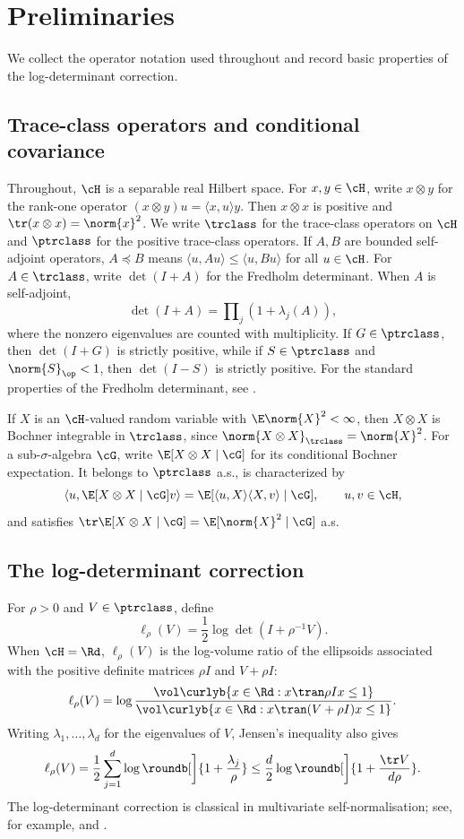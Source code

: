 \documentclass[11pt]{article}
\begin{document}
\section{Preliminaries}
\label{sec:prelims}

We collect the operator notation used throughout and record basic properties of the log-determinant correction.

\subsection{Trace-class operators and conditional covariance}
Throughout, $\cH$ is a separable real Hilbert space. For $x,y\in\cH$, write
$x\otimes y$ for the rank-one operator $(x\otimes y)u=\langle x,u\rangle y$.
Then $x\otimes x$ is positive and $\tr(x\otimes x)=\norm{x}^2$. We write
$\trclass$ for the trace-class operators on $\cH$ and $\ptrclass$
for the positive trace-class operators. If $A,B$ are bounded self-adjoint operators,
$A\preceq B$ means $\langle u,Au\rangle\le\langle u,Bu\rangle$ for all $u\in\cH$. For $A\in\trclass$, write $\det(I+A)$ for the Fredholm determinant. When $A$ is self-adjoint,
\[
  \det(I+A)=\prod\nolimits_j(1+\lambda_j(A)),
\]
where the nonzero eigenvalues are counted with multiplicity. If $G\in\ptrclass$, then $\det(I+G)$ is strictly positive, while if $S\in\ptrclass$ and $\norm{S}_{\op}<1$, then $\det(I-S)$ is strictly positive. For the standard properties of the Fredholm determinant, see \citet[Ch.~3]{simon2005trace}.

If $X$ is an $\cH$-valued random variable with $\E\norm{X}^2<\infty$, then $X\otimes X$ is Bochner integrable in $\trclass$, since $\norm{X\otimes X}_{\trclass}=\norm{X}^2$. For a sub-$\sigma$-algebra $\cG$, write $\E[X\otimes X\mid\cG]$ for its conditional Bochner expectation. It belongs to $\ptrclass$ a.s., is characterized by
\[
  \langle u,\E[X\otimes X\mid\cG]v\rangle=\E[\langle u,X\rangle\langle X,v\rangle\mid\cG], \qquad u,v\in\cH,
\]
and satisfies $\tr\E[X\otimes X\mid\cG]=\E[\norm{X}^2\mid\cG]$ a.s.

\subsection{The log-determinant correction} For $\rho>0$ and $V\in\ptrclass$, define
\[
  \ell_\rho(V)=\frac12\log\det(I+\rho^{-1}V).
\]
When $\cH=\Rd$, $\ell_\rho(V)$ is the log-volume ratio of the ellipsoids associated with the positive definite matrices $\rho I$ and $V+\rho I$:
\[
  \ell_\rho(V) = \log \frac{\vol\curlyb{x\in\Rd:x\tran \rho I x\le1}}{\vol\curlyb{x\in\Rd:x\tran (V+\rho I)x\le1}}.
\]
Writing $\lambda_1,\dots,\lambda_d$ for the eigenvalues of $V$, Jensen's inequality also gives
\[
  \ell_\rho(V) = \frac{1}{2}\sum_{j=1}^d\log\roundb[\bigg]{1+\frac{\lambda_j}{\rho}} \le \frac{d}{2}\log\roundb[\bigg]{1+\frac{\tr V}{d\rho}}.
\]
The log-determinant correction is classical in multivariate self-normalisation; see, for example, \citet[Cor.~4.3]{delapena2004selfnormalized} and \citet[Thm.~14.7]{delapena2009selfnormalized}.
\end{document}
